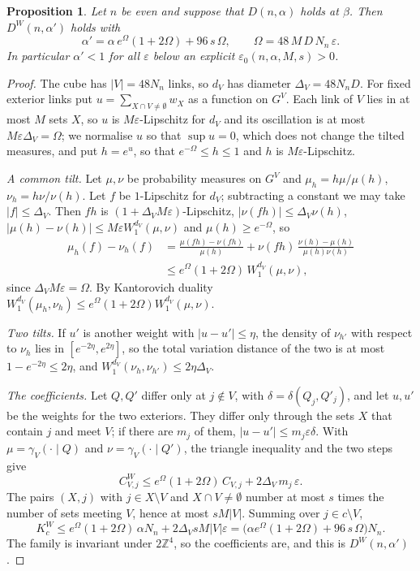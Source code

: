 \documentclass[11pt]{amsart}
\newtheorem{proposition}[theorem]{Proposition}
\theoremstyle{definition}
\theoremstyle{remark}
\numberwithin{equation}{section}
\newcommand{\Z}{\mathbb{Z}}
\begin{document}
\begin{proposition}\label{prop:cubeopen}
Let $n$ be even and suppose that $D(n,\alpha)$ holds at $\beta$. Then
$D^W(n,\alpha')$ holds with
\[
\alpha'=\alpha\,e^{\Omega}(1+2\Omega)+96\,s\,\Omega,\qquad
\Omega=48\,M\,D\,N_n\,\varepsilon .
\]
In particular $\alpha'<1$ for all $\varepsilon$ below an explicit
$\varepsilon_0(n,\alpha,M,s)>0$.
\end{proposition}

\begin{proof}
The cube has $|V|=48N_n$ links, so $d_V$ has diameter $\Delta_V=48N_nD$.
For fixed exterior links put $u=\sum_{X\cap V\ne\emptyset}w_X$ as a function
on $G^V$. Each link of $V$ lies in at most $M$ sets $X$, so $u$ is
$M\varepsilon$-Lipschitz for $d_V$ and its oscillation is at most
$M\varepsilon\Delta_V=\Omega$; we normalise $u$ so that $\sup u=0$, which
does not change the tilted measures, and put $h=e^u$, so that
$e^{-\Omega}\le h\le1$ and $h$ is $M\varepsilon$-Lipschitz.

\emph{A common tilt.} Let $\mu,\nu$ be probability measures on $G^V$ and
$\mu_h=h\mu/\mu(h)$, $\nu_h=h\nu/\nu(h)$. Let $f$ be $1$-Lipschitz for $d_V$;
subtracting a constant we may take $|f|\le\Delta_V$. Then $fh$ is
$(1+\Delta_VM\varepsilon)$-Lipschitz, $|\nu(fh)|\le\Delta_V\nu(h)$,
$|\mu(h)-\nu(h)|\le M\varepsilon W_1^{d_V}(\mu,\nu)$ and $\mu(h)\ge
e^{-\Omega}$, so
\[
\begin{split}
\mu_h(f)-\nu_h(f)&=\frac{\mu(fh)-\nu(fh)}{\mu(h)}+\nu(fh)\,
\frac{\nu(h)-\mu(h)}{\mu(h)\nu(h)}\\
&\le e^{\Omega}(1+2\Omega)\,W_1^{d_V}(\mu,\nu),
\end{split}
\]
since $\Delta_VM\varepsilon=\Omega$. By Kantorovich duality
$W_1^{d_V}(\mu_h,\nu_h)\le e^{\Omega}(1+2\Omega)W_1^{d_V}(\mu,\nu)$.

\emph{Two tilts.} If $u'$ is another weight with $|u-u'|\le\eta$, the
density of $\nu_{h'}$ with respect to $\nu_h$ lies in $[e^{-2\eta},e^{2\eta}]$,
so the total variation distance of the two is at most $1-e^{-2\eta}\le
2\eta$, and $W_1^{d_V}(\nu_h,\nu_{h'})\le2\eta\Delta_V$.

\emph{The coefficients.} Let $Q,Q'$ differ only at $j\notin V$, with
$\delta=\delta(Q_j,Q'_j)$, and let $u,u'$ be the weights for the two
exteriors. They differ only through the sets $X$ that contain $j$ and meet
$V$; if there are $m_j$ of them, $|u-u'|\le m_j\varepsilon\delta$. With
$\mu=\gamma_V(\cdot\mid Q)$ and $\nu=\gamma_V(\cdot\mid Q')$, the triangle
inequality and the two steps give
\[
C^W_{V,j}\le e^{\Omega}(1+2\Omega)\,C_{V,j}+2\Delta_V\,m_j\,\varepsilon .
\]
The pairs $(X,j)$ with $j\in X\setminus V$ and $X\cap V\ne\emptyset$ number
at most $s$ times the number of sets meeting $V$, hence at most $sM|V|$. Summing
over $j\in c\setminus V$,
\[
K^W_c\le e^{\Omega}(1+2\Omega)\,\alpha N_n+2\Delta_VsM|V|\varepsilon
=\bigl(\alpha e^{\Omega}(1+2\Omega)+96\,s\,\Omega\bigr)N_n .
\]
The family is invariant under $2\Z^4$, so the coefficients are, and this is
$D^W(n,\alpha')$.
\end{proof}
\end{document}
